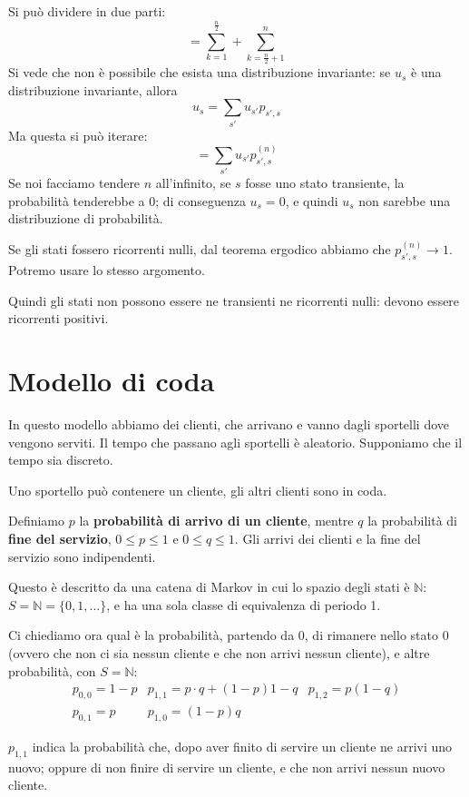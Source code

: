 \documentclass[a4paper,12pt]{book}
\begin{document}
Si può dividere in due parti:
$$ = \sum_{k=1}^{\frac{n}{2}} + \sum_{k=\frac{n}{2} + 1}^{n}$$
Si vede che non è possibile che esista una distribuzione invariante: se $ u_s $ è una distribuzione invariante, allora
$$ u_s = \sum_{s'}u_{s'} p_{s',s} $$
Ma questa si può iterare:
$$ = \sum_{s'}u_{s'} p^{(n)}_{s',s} $$
Se noi facciamo tendere $ n $ all'infinito, se $ s $ fosse uno stato transiente, la probabilità tenderebbe a 0; di conseguenza $ u_s = 0 $, e quindi $ u_s $ non sarebbe una distribuzione di probabilità.

Se gli stati fossero ricorrenti nulli, dal teorema ergodico abbiamo che $ p^{(n)}_{s',s} \to 1 $. Potremo usare lo stesso argomento. 

Quindi gli stati non possono essere ne transienti ne ricorrenti nulli: devono essere ricorrenti positivi. 

\section{Modello di coda}
In questo modello abbiamo dei clienti, che arrivano e vanno dagli sportelli dove vengono serviti. Il tempo che passano agli sportelli è aleatorio. Supponiamo che il tempo sia discreto. 

Uno sportello può contenere un cliente, gli altri clienti sono in coda. 

Definiamo $ p $ la \textbf{probabilità di arrivo di un cliente}, mentre $ q $ la probabilità di \textbf{fine del servizio}, $ 0 \le p \le 1 $ e $ 0 \le q \le 1 $. Gli arrivi dei clienti e la fine del servizio sono indipendenti. 

Questo è descritto da una catena di Markov in cui lo spazio degli stati è $ \mathbb{N} $: $ S = \mathbb{N} = \{0, 1, ...\} $, e ha una sola classe di equivalenza di periodo 1.

Ci chiediamo ora qual è la probabilità, partendo da 0, di rimanere nello stato 0 (ovvero che non ci sia nessun cliente e che non arrivi nessun cliente), e altre probabilità, con $ S = \mathbb{N} $:
$$ \begin{array}{ccc}
  p_{0,0} = 1-p & p_{1,1} = p\cdot q + (1-p) 1-q  & p_{1,2} = p(1-q) \\
  p_{0,1} = p & p_{1,0} = (1-p)q & 
\end{array} $$

$ p_{1,1} $ indica la probabilità che, dopo aver finito di servire un cliente ne arrivi uno nuovo; oppure di non finire di servire un cliente, e che non arrivi nessun nuovo cliente. 
\end{document}
